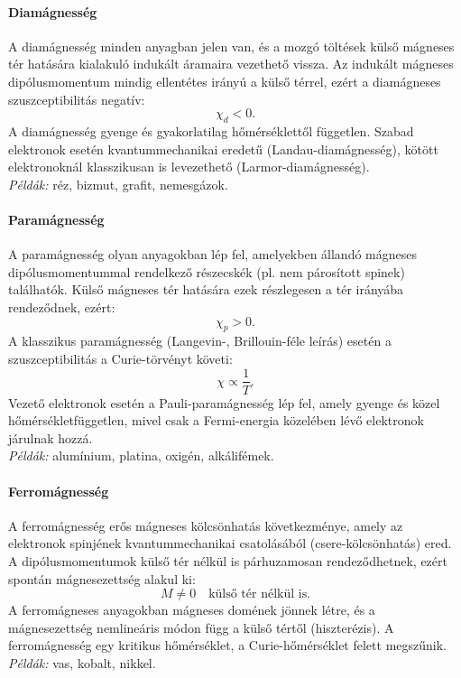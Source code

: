 \documentclass[../main.tex]{subfiles}
\begin{document}
\paragraph{Diamágnesség}
A diamágnesség minden anyagban jelen van, és a mozgó töltések külső mágneses tér hatására
kialakuló indukált áramaira vezethető vissza. Az indukált mágneses dipólusmomentum mindig
ellentétes irányú a külső térrel, ezért a diamágneses szuszceptibilitás negatív:
\[
\chi_d < 0.
\]
A diamágnesség gyenge és gyakorlatilag hőmérséklettől független. Szabad elektronok esetén
kvantummechanikai eredetű (Landau-diamágnesség), kötött elektronoknál klasszikusan is
levezethető (Larmor-diamágnesség).
\\
\textit{Példák:} réz, bizmut, grafit, nemesgázok.

\paragraph{Paramágnesség}
A paramágnesség olyan anyagokban lép fel, amelyekben állandó mágneses dipólusmomentummal
rendelkező részecskék (pl. nem párosított spinek) találhatók. Külső mágneses tér hatására
ezek részlegesen a tér irányába rendeződnek, ezért:
\[
\chi_p > 0.
\]
A klasszikus paramágnesség (Langevin-, Brillouin-féle leírás) esetén a szuszceptibilitás
a Curie-törvényt követi:
\[
\chi \propto \frac{1}{T}.
\]
Vezető elektronok esetén a Pauli-paramágnesség lép fel, amely gyenge és közel
hőmérsékletfüggetlen, mivel csak a Fermi-energia közelében lévő elektronok járulnak hozzá.
\\
\textit{Példák:} alumínium, platina, oxigén, alkálifémek.

\paragraph{Ferromágnesség}
A ferromágnesség erős mágneses kölcsönhatás következménye, amely az elektronok
spinjének kvantummechanikai csatolásából (csere-kölcsönhatás) ered. A dipólusmomentumok
külső tér nélkül is párhuzamosan rendeződhetnek, ezért spontán mágnesezettség alakul ki:
\[
M \neq 0 \quad \text{külső tér nélkül is}.
\]
A ferromágneses anyagokban mágneses domének jönnek létre, és a mágnesezettség
nemlineáris módon függ a külső tértől (hiszterézis). A ferromágnesség egy kritikus
hőmérséklet, a Curie-hőmérséklet felett megszűnik.
\\
\textit{Példák:} vas, kobalt, nikkel.
\end{document}
